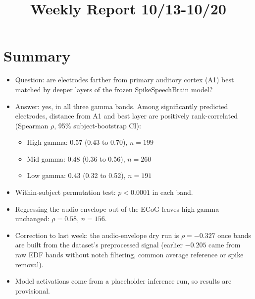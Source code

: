 \documentclass[11pt]{article}
\title{Weekly Report 10/13-10/20}
\author{}
\date{}
\begin{document}
\begingroup\makeatletter\renewcommand{\@maketitle}{\begin{center}{\LARGE\@title\par}\end{center}\vspace{-4pt}}\makeatother\maketitle\endgroup

\section*{Summary}
\begin{itemize}
  \item Question: are electrodes farther from primary auditory cortex (A1) best matched by deeper layers of the frozen SpikeSpeechBrain model?
  \item Answer: yes, in all three gamma bands. Among significantly predicted electrodes, distance from A1 and best layer are positively rank-correlated (Spearman $\rho$, 95\% subject-bootstrap CI):
  \begin{itemize}
    \item High gamma: $0.57$ (0.43 to 0.70), $n = 199$
    \item Mid gamma: $0.48$ (0.36 to 0.56), $n = 260$
    \item Low gamma: $0.43$ (0.32 to 0.52), $n = 191$
  \end{itemize}
  \item Within-subject permutation test: $p < 0.0001$ in each band.
  \item Regressing the audio envelope out of the ECoG leaves high gamma unchanged: $\rho = 0.58$, $n = 156$.
  \item Correction to last week: the audio-envelope dry run is $\rho = -0.327$ once bands are built from the dataset's preprocessed signal (earlier $-0.205$ came from raw EDF bands without notch filtering, common average reference or spike removal).
  \item Model activations come from a placeholder inference run, so results are provisional.
\end{itemize}
\end{document}
